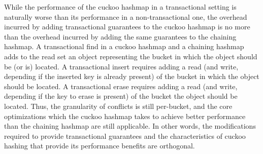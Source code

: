 While the performance of the cuckoo hashmap in a transactional setting is naturally worse than its performance in a non-transactional one, the overhead incurred by adding transactional guarantees to the cuckoo hashmap is no more than the overhead incurred by adding the same guarantees to the chaining hashmap. 
A transactional find in a cuckoo hashmap and a chaining hashmap adds to the read set an object representing the bucket in which the object should be (or is) located.  A transactional insert requires adding a read (and write, depending if the inserted key is already present) of the bucket in which the object should be located. A transactional erase requires adding a read (and write, depending if the key to erase is present) of the bucket the object should be located. Thus, the granularity of conflicts is still per-bucket, and the core optimizations which the cuckoo hashmap takes to achieve better performance than the chaining hashmap are still applicable. In other words, the modifications required to provide transactional guarantees and the characteristics of cuckoo hashing that provide its performance benefits are orthogonal.
